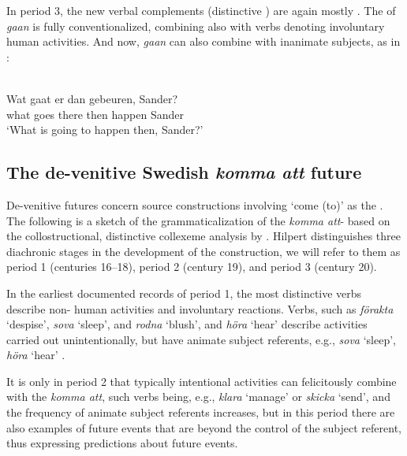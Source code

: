 \documentclass[output=paper]{langsci/langscibook}
\begin{document}
  In period 3, the new verbal complements (distinctive ) are again mostly . The  of \textit{gaan} is fully conventionalized, combining also with verbs denoting involuntary human activities. And now, \textit{gaan} can also combine with inanimate subjects, as in :



\ea%
    \label{ex:heine:12} 

 \\
\gll Wat    gaat    er      dan  gebeuren,   Sander?\\
  what     goes    there    then  happen    Sander\\
\glt  ‘What is going to happen then, Sander?’
\z




\subsection{The de-venitive Swedish \emph{komma att} future}\label{sec:heine:3.3}



De-venitive futures concern source constructions involving ‘come (to)’ as the . The following is a sketch of the grammaticalization of the  \textit{komma att}- based on the collostructional, distinctive collexeme analysis by \citet[125--131]{Hilpert2008}. Hilpert distinguishes three diachronic stages in the development of the construction, we will refer to them as 
period 1 (centuries 16--18), 
period 2 (century 19), and 
period 3 (century 20).



In the earliest documented records of period 1, the most distinctive verbs describe non- human activities and involuntary reactions. Verbs, such as \textit{förakta} ‘despise’, 
\textit{sova} ‘sleep’, and 
\textit{rodna} ‘blush’, and 
\textit{höra} ‘hear’ describe activities carried out unintentionally, but have animate subject referents, e.g., 
\textit{sova} ‘sleep’, 
\textit{höra} ‘hear’ \citep[128]{Hilpert2008}.  



It is only in period 2 that typically intentional activities can felicitously combine with the  \textit{komma att}, such verbs being, e.g., \textit{klara} ‘manage’ or \textit{skicka} ‘send’, and the frequency of animate subject referents increases, but in this period there are also examples of future events that are beyond the control of the subject referent, thus expressing predictions about future events.
\end{document}
